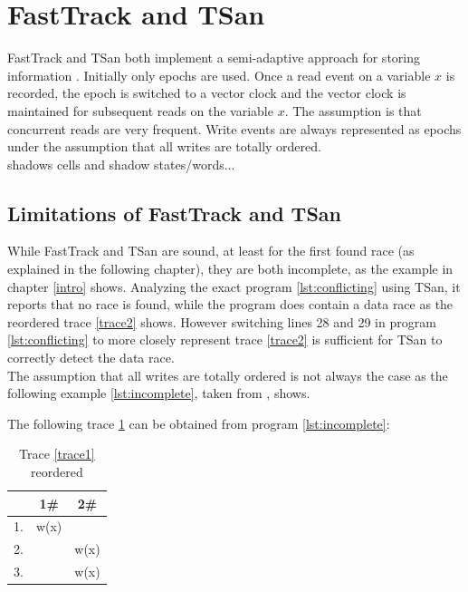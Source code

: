 \documentclass[12pt]{article}
\begin{document}
	\section{FastTrack and TSan}\label{fasttrack-sec}
	FastTrack and TSan both implement a semi-adaptive approach for storing information \cite[p. 10]{sulzmann2}. Initially only epochs are used. Once a read event on a variable $x$ is recorded, the epoch is switched to a vector clock and the vector clock is maintained for subsequent reads on the variable $x$. The assumption is that concurrent reads are very frequent. Write events are always represented as epochs under the assumption that all writes are totally ordered.\\
	shadows cells and shadow states/words...
	\subsection{Limitations of FastTrack and TSan}
	While FastTrack and TSan are sound, at least for the first found race (as explained in the following chapter), they are both incomplete, as the example in chapter \ref{intro} shows. Analyzing the exact program \ref{lst:conflicting} using TSan, it reports that no race is found, while the program does contain a data race as the reordered trace \ref{trace2} shows. However switching lines 28 and 29 in program \ref{lst:conflicting} to more closely represent trace \ref{trace2} is sufficient for TSan to correctly detect the data race.\\
	The assumption that all writes are totally ordered is not always the case as the following example \ref{lst:incomplete}, taken from \cite[p. 10]{sulzmann2}, shows.\\
	\begin{minipage}{\linewidth}
		
	\end{minipage}
	The following trace \ref{trace4} can be obtained from program \ref{lst:incomplete}:
	\begin{table}[H]
		\begin{center}
			\begin{tabular}{ c c c}
				& 1\# & 2\# \\
				\hline
				1. & w(x) & \\
				2. & & w(x) \\
				3. & & w(x) \\
			\end{tabular}
			\caption{Trace \ref{trace1} reordered}
			\label{trace4}
		\end{center}
	\end{table}
\end{document}
